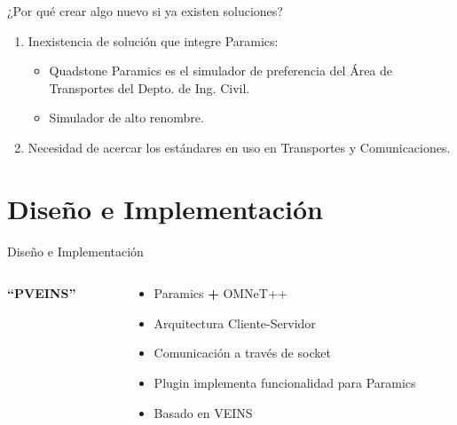 \documentclass[aspectratio=169]{beamer}
\begin{document}
\begin{frame}{¿Por qué crear algo nuevo si ya existen soluciones?}
\begin{enumerate}
    \item Inexistencia de solución que integre Paramics:\pause
    \begin{itemize}
        \item Quadstone Paramics es el simulador de preferencia del Área de Transportes del Depto. de Ing. Civil.
        \item Simulador de alto renombre.\pause
    \end{itemize}
    \item Necesidad de acercar los estándares en uso en Transportes y Comunicaciones.

\end{enumerate}
\end{frame}


\section{Diseño e Implementación}
\begin{frame}{Diseño e Implementación}
    \begin{columns}
        \begin{column}{.3\linewidth}
            \centering
            \huge\textbf{``PVEINS''}\pause
        \end{column}
        \begin{column}{.7\linewidth}
            \begin{itemize}
                \item Paramics \textbf{+} OMNeT++\pause
                \item Arquitectura Cliente-Servidor\pause
                \item Comunicación a través de socket\pause
                \item Plugin implementa funcionalidad para Paramics\pause
                \item Basado en VEINS 
            \end{itemize}
        \end{column}
    \end{columns}
\end{frame}
\end{document}
